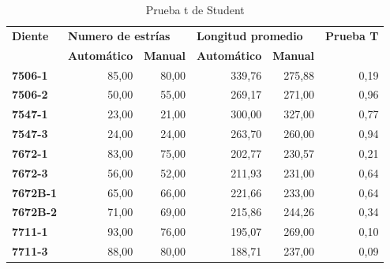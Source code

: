 \begin{table}[]
\centering
\caption{Prueba t de Student}
\label{tab:estud}
\begin{tabular}{@{} lrrrrr @{}}
\toprule
\multirow{2}{*}{\textbf{Diente}} & \multicolumn{2}{l}{\textbf{Numero de estrías}} & \multicolumn{2}{l}{\textbf{Longitud promedio}} & \multirow{2}{*}{\textbf{Prueba T}} \\ \cline{2-5}
                                 & \textbf{Automático}      & \textbf{Manual}     & \textbf{Automático}      & \textbf{Manual}     &                                    \\ \midrule
\textbf{7506-1}                  & 85,00                    & 80,00               & 339,76                   & 275,88              & 0,19                               \\ \midrule
\textbf{7506-2}                  & 50,00                    & 55,00               & 269,17                   & 271,00              & 0,96                               \\ \midrule
\textbf{7547-1}                  & 23,00                    & 21,00               & 300,00                   & 327,00              & 0,77                               \\ \midrule
\textbf{7547-3}                  & 24,00                    & 24,00               & 263,70                   & 260,00              & 0,94                               \\ \midrule
\textbf{7672-1}                  & 83,00                    & 75,00               & 202,77                   & 230,57              & 0,21                               \\ \midrule
\textbf{7672-3}                  & 56,00                    & 52,00               & 211,93                   & 231,00              & 0,64                               \\ \midrule
\textbf{7672B-1}                 & 65,00                    & 66,00               & 221,66                   & 233,00              & 0,64                               \\ \midrule
\textbf{7672B-2}                 & 71,00                    & 69,00               & 215,86                   & 244,26              & 0,34                               \\ \midrule
\textbf{7711-1}                  & 93,00                    & 76,00               & 195,07                   & 269,00              & 0,10                               \\ \midrule
\textbf{7711-3}                  & 88,00                    & 80,00               & 188,71                   & 237,00              & 0,09                               \\ \bottomrule
\end{tabular}
\end{table}